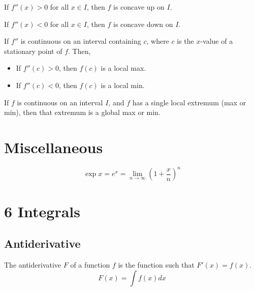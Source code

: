 \begin{theorem}
  If $f''(x) > 0$ for all $x \in I$, then $f$ is concave up on $I$.

  If $f''(x) < 0$ for all $x \in I$, then $f$ is concave down on $I$.
\end{theorem}

\begin{theorem}
  If $f''$ is continuous on an interval containing $c$, where $c$ is the $x$-value of a stationary point of $f$. Then,
  \begin{itemize}
    \item If $f''(c) > 0$, then $f(c)$ is a local max.
    \item If $f''(c) < 0$, then $f(c)$ is a local min.
  \end{itemize}
\end{theorem}

\begin{namedtheorem}
  If $f$ is continuous on an interval $I$, and $f$ has a single local extremum (max or min), then that extremum is a global max or min.
\end{namedtheorem}

\section*{Miscellaneous}

\begin{definition}
  \[
    \exp x = e^x = \lim_{n \to \infty} \left(1 + \frac{x}{n}\right)^n
  \]
\end{definition}

\columnbreak

\section*{6 Integrals}

\subsection*{Antiderivative}

\begin{definition}
  The antiderivative $F$ of a function $f$ is the function such that $F'(x) = f(x)$.
  \[
    F(x) = \int f(x) dx
  \]
\end{definition}

